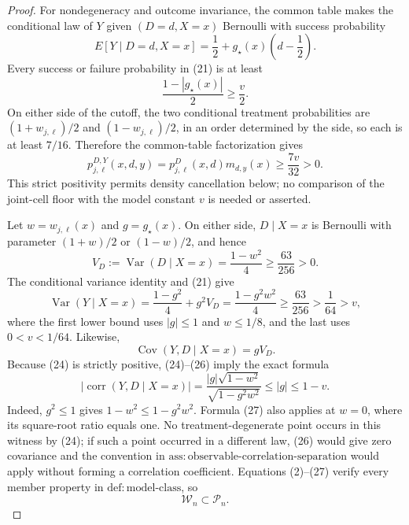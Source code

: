 \documentclass{article}
\begin{document}
\begin{proof}
For nondegeneracy and outcome invariance, the common table makes the conditional law of \(Y\) given \((D=d,X=x)\) Bernoulli with success probability
\[
E[Y\mid D=d,X=x]=\frac12+g_\star(x)\left(d-\frac12\right).
\tag{21}
\]
Every success or failure probability in (21) is at least
\[
\frac{1-|g_\star(x)|}{2}\ge\frac v2.
\tag{22}
\]
On either side of the cutoff, the two conditional treatment probabilities are \((1+w_{j,\ell})/2\) and \((1-w_{j,\ell})/2\), in an order determined by the side, so each is at least \(7/16\).  Therefore the common-table factorization gives
\[
p_{j,\ell}^{D,Y}(x,d,y)
=p_{j,\ell}^{D}(x,d)m_{d,y}(x)
\ge\frac{7v}{32}>0.
\tag{23}
\]
This strict positivity permits density cancellation below; no comparison of the joint-cell floor with the model constant \(v\) is needed or asserted.

Let \(w=w_{j,\ell}(x)\) and \(g=g_\star(x)\).  On either side, \(D\mid X=x\) is Bernoulli with parameter \((1+w)/2\) or \((1-w)/2\), and hence
\[
V_D:=\operatorname{Var}(D\mid X=x)=\frac{1-w^2}{4}\ge\frac{63}{256}>0.
\tag{24}
\]
The conditional variance identity and (21) give
\[
\operatorname{Var}(Y\mid X=x)
=\frac{1-g^2}{4}+g^2V_D
=\frac{1-g^2w^2}{4}
\ge\frac{63}{256}>\frac1{64}>v,
\tag{25}
\]
where the first lower bound uses \(|g|\le1\) and \(w\le1/8\), and the last uses \(0<v<1/64\).  Likewise,
\[
\operatorname{Cov}(Y,D\mid X=x)=gV_D.
\tag{26}
\]
Because (24) is strictly positive, (24)--(26) imply the exact formula
\[
|\operatorname{corr}(Y,D\mid X=x)|
=\frac{|g|\sqrt{1-w^2}}{\sqrt{1-g^2w^2}}
\le |g|\le1-v.
\tag{27}
\]
Indeed, \(g^2\le1\) gives \(1-w^2\le1-g^2w^2\).  Formula (27) also applies at \(w=0\), where its square-root ratio equals one.  No treatment-degenerate point occurs in this witness by (24); if such a point occurred in a different law, (26) would give zero covariance and the convention in \(\mathrm{ass:observable\mbox{-}correlation\mbox{-}separation}\) would apply without forming a correlation coefficient.  Equations (2)--(27) verify every member property in \(\mathrm{def:model\mbox{-}class}\), so
\[
\mathcal W_n\subset\mathcal P_n.
\tag{28}
\]


\end{proof}
\end{document}

